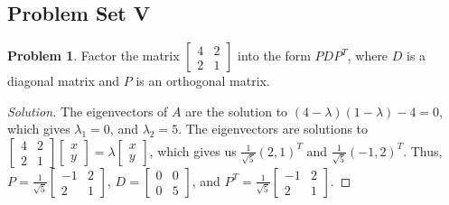 \documentclass[oneside]{book}
\theoremstyle{definition}
\newtheorem{problem}{Problem}[section]
\begin{document}
\subsection*{Problem Set V}
\begin{problem}
Factor the matrix $\begin{bmatrix} 4 & 2 \\ 2 & 1 \end{bmatrix}$ into the form $PDP^T$, where $D$ is a diagonal matrix and $P$ is an orthogonal matrix.
\end{problem}
\begin{proof}[Solution]
The eigenvectors of $A$ are the solution to $(4-\lambda)(1-\lambda)-4=0$, which gives $\lambda_1 = 0$, and $\lambda_2 = 5$. The eigenvectors are solutions to $\begin{bmatrix} 4 & 2 \\ 2 & 1 \end{bmatrix} \begin{bmatrix} x \\ y \end{bmatrix} = \lambda \begin{bmatrix} x \\ y \end{bmatrix}$, which gives us $\frac{1}{\sqrt{5}}(2,1)^T$ and $\frac{1}{\sqrt{5}}(-1,2)^T$. Thus, $P = \frac{1}{\sqrt{5}}\begin{bmatrix} -1 & 2 \\ 2 & 1 \end{bmatrix}$, $D = \begin{bmatrix} 0 & 0 \\ 0 & 5 \end{bmatrix}$, and $P^{T} = \frac{1}{\sqrt{5}}\begin{bmatrix} -1 & 2 \\ 2 & 1 \end{bmatrix}$.
\end{proof}
\end{document}

